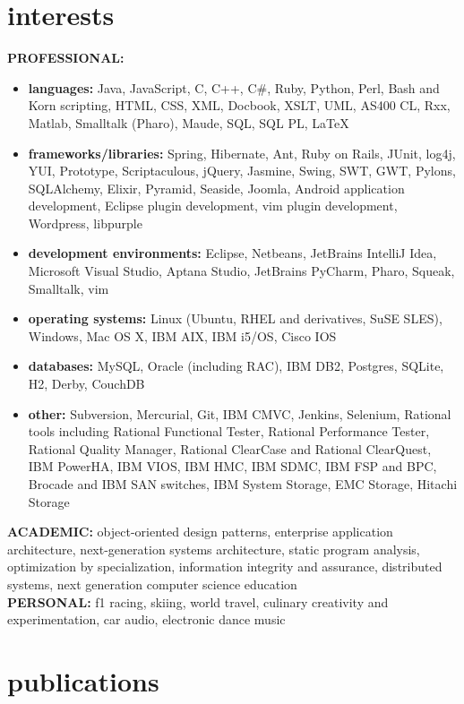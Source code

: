 \documentclass{friggeri-cv} %
\begin{document}
\section{interests}

\textbf{PROFESSIONAL:} 
\begin{itemize}
\item \textbf{languages:} Java, JavaScript, C, C++, C\#, Ruby, Python, Perl, Bash and Korn scripting, HTML, CSS, XML, Docbook,
XSLT, UML, AS400 CL, Rxx, Matlab, Smalltalk (Pharo), Maude, SQL, SQL PL, \LaTeX
\item \textbf{frameworks/libraries:} Spring, Hibernate, Ant, Ruby on Rails, JUnit, log4j, YUI, Prototype, Scriptaculous, jQuery, Jasmine,
Swing, SWT, GWT, Pylons, SQLAlchemy, Elixir, Pyramid, Seaside, Joomla, Android application development, Eclipse plugin development, vim plugin development,
Wordpress, libpurple
\item \textbf{development environments:} Eclipse, Netbeans, JetBrains IntelliJ Idea, Microsoft Visual Studio, Aptana Studio, JetBrains PyCharm, Pharo, Squeak,
Smalltalk, vim
\item \textbf{operating systems:} Linux (Ubuntu, RHEL and derivatives, SuSE SLES), Windows, Mac OS X, IBM AIX, IBM i5/OS,
Cisco IOS
\item \textbf{databases:} MySQL, Oracle (including RAC), IBM DB2, Postgres, SQLite, H2, Derby, CouchDB
\item \textbf{other:} Subversion, Mercurial, Git, IBM CMVC, Jenkins, Selenium, Rational tools including Rational Functional Tester, Rational Performance
Tester, Rational Quality Manager, Rational ClearCase and Rational ClearQuest, IBM PowerHA, IBM VIOS, IBM HMC, IBM
SDMC, IBM FSP and BPC, Brocade and IBM SAN switches, IBM System Storage, EMC Storage, Hitachi Storage
\end{itemize}
\textbf{ACADEMIC:} object-oriented design patterns, enterprise application architecture, next-generation systems architecture, static program analysis, optimization by specialization, information integrity and assurance, distributed systems, next generation computer science education \\
\textbf{PERSONAL:} f1 racing, skiing, world travel, culinary creativity and experimentation, car audio, electronic dance music
\pagebreak

\section{publications}




\end{document}
